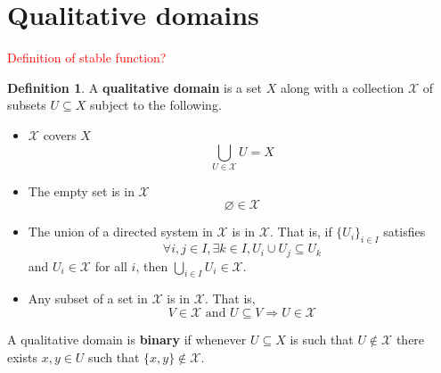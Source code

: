 \documentclass[12pt]{article}
\theoremstyle{plain}
\theoremstyle{definition}
\newtheorem{defn}[thm]{Definition} %
\newcommand{\scr}[1]{\mathscr{#1}}
\begin{document}
	\section{Qualitative domains}
	\textcolor{red}{Definition of stable function?}
	\begin{defn}
		A \textbf{qualitative domain} is a set $X$ along with a collection $\scr{X}$ of subsets $U \subseteq X$ subject to the following.
		\begin{itemize}
			\item $\scr{X}$ covers $X$
			\begin{equation}
				\bigcup_{U \in \scr{X}}U = X
				\end{equation}
			\item The empty set is in $\scr{X}$
			\begin{equation}
				\varnothing \in \scr{X}
				\end{equation}
			\item The union of a directed system in $\scr{X}$ is in $\scr{X}$. That is, if $\{ U_i \}_{i \in I}$ satisfies
			\begin{equation}
				\forall i, j \in I, \exists k \in I, U_i \cup U_j \subseteq U_k
				\end{equation}
			and $U_i \in \scr{X}$ for all $i$, then $\bigcup_{i \in I} U_i \in \scr{X}$.
			\item Any subset of a set in $\scr{X}$ is in $\scr{X}$. That is,
			\begin{equation}
				V \in \scr{X}\text{ and }U \subseteq V \Longrightarrow U \in \scr{X}
				\end{equation}
			\end{itemize}
		A qualitative domain is \textbf{binary} if whenever $U\subseteq X$ is such that $U \not\in \scr{X}$ there exists $x,y \in U$ such that $\{ x,y \} \not\in \scr{X}$.
		\end{defn}
	
\end{document}
